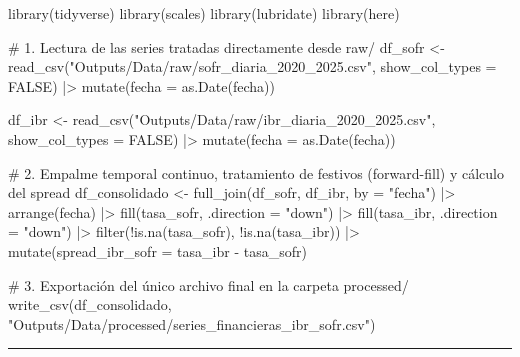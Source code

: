 \documentclass[
  10pt,
  letterpaper,
  DIV=11,
  numbers=noendperiod]{scrartcl}
\newenvironment{Shaded}{\begin{snugshade}}{\end{snugshade}}
\newcommand{\AttributeTok}[1]{\textcolor[rgb]{0.40,0.45,0.13}{#1}}
\newcommand{\CommentTok}[1]{\textcolor[rgb]{0.37,0.37,0.37}{#1}}
\newcommand{\ConstantTok}[1]{\textcolor[rgb]{0.56,0.35,0.01}{#1}}
\newcommand{\FunctionTok}[1]{\textcolor[rgb]{0.28,0.35,0.67}{#1}}
\newcommand{\NormalTok}[1]{\textcolor[rgb]{0.00,0.23,0.31}{#1}}
\newcommand{\OtherTok}[1]{\textcolor[rgb]{0.00,0.23,0.31}{#1}}
\newcommand{\SpecialCharTok}[1]{\textcolor[rgb]{0.37,0.37,0.37}{#1}}
\newcommand{\StringTok}[1]{\textcolor[rgb]{0.13,0.47,0.30}{#1}}
\begin{document}
\begin{Shaded}
\begin{Highlighting}[]
\FunctionTok{library}\NormalTok{(tidyverse)}
\FunctionTok{library}\NormalTok{(scales)}
\FunctionTok{library}\NormalTok{(lubridate)}
\FunctionTok{library}\NormalTok{(here)}

\CommentTok{\# 1. Lectura de las series tratadas directamente desde raw/}
\NormalTok{df\_sofr }\OtherTok{\textless{}{-}} \FunctionTok{read\_csv}\NormalTok{(}\StringTok{"Outputs/Data/raw/sofr\_diaria\_2020\_2025.csv"}\NormalTok{, }\AttributeTok{show\_col\_types =} \ConstantTok{FALSE}\NormalTok{) }\SpecialCharTok{|\textgreater{}}
  \FunctionTok{mutate}\NormalTok{(}\AttributeTok{fecha =} \FunctionTok{as.Date}\NormalTok{(fecha))}

\NormalTok{df\_ibr }\OtherTok{\textless{}{-}} \FunctionTok{read\_csv}\NormalTok{(}\StringTok{"Outputs/Data/raw/ibr\_diaria\_2020\_2025.csv"}\NormalTok{, }\AttributeTok{show\_col\_types =} \ConstantTok{FALSE}\NormalTok{) }\SpecialCharTok{|\textgreater{}}
  \FunctionTok{mutate}\NormalTok{(}\AttributeTok{fecha =} \FunctionTok{as.Date}\NormalTok{(fecha))}

\CommentTok{\# 2. Empalme temporal continuo, tratamiento de festivos (forward{-}fill) y cálculo del spread}
\NormalTok{df\_consolidado }\OtherTok{\textless{}{-}} \FunctionTok{full\_join}\NormalTok{(df\_sofr, df\_ibr, }\AttributeTok{by =} \StringTok{"fecha"}\NormalTok{) }\SpecialCharTok{|\textgreater{}}
  \FunctionTok{arrange}\NormalTok{(fecha) }\SpecialCharTok{|\textgreater{}}
  \FunctionTok{fill}\NormalTok{(tasa\_sofr, }\AttributeTok{.direction =} \StringTok{"down"}\NormalTok{) }\SpecialCharTok{|\textgreater{}}
  \FunctionTok{fill}\NormalTok{(tasa\_ibr, }\AttributeTok{.direction =} \StringTok{"down"}\NormalTok{) }\SpecialCharTok{|\textgreater{}}
  \FunctionTok{filter}\NormalTok{(}\SpecialCharTok{!}\FunctionTok{is.na}\NormalTok{(tasa\_sofr), }\SpecialCharTok{!}\FunctionTok{is.na}\NormalTok{(tasa\_ibr)) }\SpecialCharTok{|\textgreater{}}
  \FunctionTok{mutate}\NormalTok{(}\AttributeTok{spread\_ibr\_sofr =}\NormalTok{ tasa\_ibr }\SpecialCharTok{{-}}\NormalTok{ tasa\_sofr)}

\CommentTok{\# 3. Exportación del único archivo final en la carpeta processed/}
\FunctionTok{write\_csv}\NormalTok{(df\_consolidado, }\StringTok{"Outputs/Data/processed/series\_financieras\_ibr\_sofr.csv"}\NormalTok{)}
\end{Highlighting}
\end{Shaded}

\begin{center}\rule{0.5\linewidth}{0.5pt}\end{center}
\end{document}

